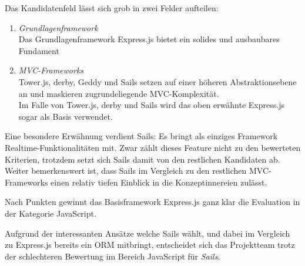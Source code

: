 Das Kandidatenfeld lässt sich grob in zwei Felder aufteilen:

\begin{enumerate}
	\item \emph{Grundlagenframework} \\
	Das Grundlagenframework Express.js bietet ein solides und ausbaubares Fundament
	\item \emph{MVC-Frameworks} \\
	Tower.js, derby, Geddy und Sails setzen auf einer höheren Abstraktionsebene an und maskieren zugrundeliegende MVC-Komplexität. \\ Im Falle von Tower.js, derby und Sails wird das oben erwähnte Express.js sogar als Basis verwendet.
\end{enumerate}

Eine besondere Erwähnung verdient Sails: Es bringt als einziges Framework \gls{Realtime}-Funktionalitäten mit. Zwar zählt dieses Feature nicht zu den bewerteten Kriterien, trotzdem setzt sich Sails damit von den restlichen Kandidaten ab. Weiter bemerkenswert ist, dass Sails im Vergleich zu den restlichen MVC-Frameworks einen relativ tiefen Einblick in die Konzeptinnereien zulässt.

Nach Punkten gewinnt das Basisframework Express.js ganz klar die Evaluation in der Kategorie JavaScript.

Aufgrund der interessanten Ansätze welche Sails wählt, und dabei im Vergleich zu Express.js bereits ein \gls{ORM} mitbringt, entscheidet sich das Projektteam trotz der schlechteren Bewertung im Bereich JavaScript für \emph{Sails}.
